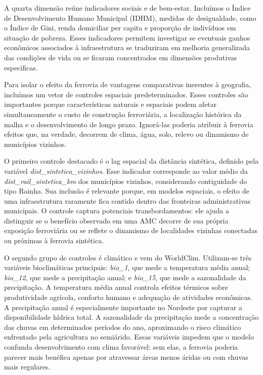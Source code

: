 \documentclass[12pt,a4paper]{article}
\begin{document}
A quarta dimensão reúne indicadores sociais e de bem-estar. Incluímos o Índice de Desenvolvimento Humano Municipal (IDHM), medidas de desigualdade, como o Índice de Gini, renda domiciliar per capita e proporção de indivíduos em situação de pobreza. Esses indicadores permitem investigar se eventuais ganhos econômicos associados à infraestrutura se traduziram em melhoria generalizada das condições de vida ou se ficaram concentrados em dimensões produtivas específicas.


Para isolar o efeito da ferrovia de vantagens comparativas inerentes à geografia, incluímos um vetor de controles espaciais predeterminados. Esses controles são importantes porque características naturais e espaciais podem afetar simultaneamente o custo de construção ferroviária, a localização histórica da malha e o desenvolvimento de longo prazo. Ignorá-las poderia atribuir à ferrovia efeitos que, na verdade, decorrem de clima, água, solo, relevo ou dinamismo de municípios vizinhos.

O primeiro controle destacado é o lag espacial da distância sintética, definido pela variável \textit{dist\_sintetica\_vizinhos}. Esse indicador corresponde ao valor médio da \textit{dist\_rail\_sintetica\_km} dos municípios vizinhos, considerando contiguidade do tipo Rainha. Sua inclusão é relevante porque, em modelos espaciais, o efeito de uma infraestrutura raramente fica contido dentro das fronteiras administrativas municipais. O controle captura potenciais transbordamentos: ele ajuda a distinguir se o benefício observado em uma AMC decorre de sua própria exposição ferroviária ou se reflete o dinamismo de localidades vizinhas conectadas ou próximas à ferrovia sintética.

O segundo grupo de controles é climático e vem do WorldClim. Utilizam-se três variáveis bioclimáticas principais: \textit{bio\_1}, que mede a temperatura média anual; \textit{bio\_12}, que mede a precipitação anual; e \textit{bio\_15}, que mede a sazonalidade da precipitação. A temperatura média anual controla efeitos térmicos sobre produtividade agrícola, conforto humano e adequação de atividades econômicas. A precipitação anual é especialmente importante no Nordeste por capturar a disponibilidade hídrica total. A sazonalidade da precipitação mede a concentração das chuvas em determinados períodos do ano, aproximando o risco climático enfrentado pela agricultura no semiárido. Essas variáveis impedem que o modelo confunda desenvolvimento com clima favorável: sem elas, a ferrovia poderia parecer mais benéfica apenas por atravessar áreas menos áridas ou com chuvas mais regulares.
\end{document}
